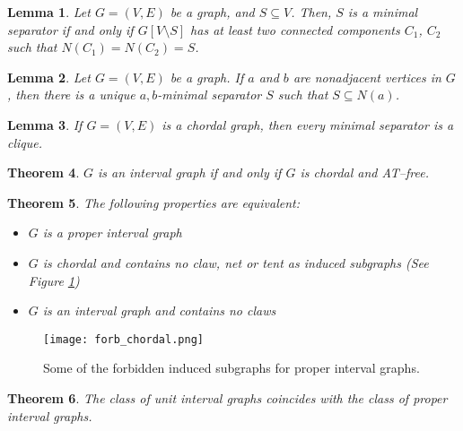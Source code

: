 \documentclass[12pt]{book}
\theoremstyle{plain}
\newtheorem{teo}{Theorem}[chapter]
\newtheorem{lema}[teo]{Lemma}
\theoremstyle{remark}
\begin{document}
\begin{lema} \label{lema_separadores_2comp} \cite{KK98}
	Let $G=(V,E)$ be a graph, and $S \subseteq V$. Then, $S$ is a minimal separator if and only if $G \left[ V \setminus S \right]$ has at least two connected components $C_1$, $C_2$ such that $N(C_1)=N(C_2)=S$.
\end{lema}

\begin{lema} \label{lema_separadores_KK} \cite{KK98}
	Let $G=(V,E)$ be a graph. If $a$ and $b$ are nonadjacent vertices in $G$, then there is a unique $a,b$-minimal separator $S$ such that $S \subseteq N(a)$.
\end{lema}

\begin{lema} \label{lema_separador_clique} \cite{D61}
	If $G = (V,E)$ is a chordal graph, then every minimal separator is a clique.
\end{lema}

\begin{teo} \label{teo_caract_intAT} \cite{LB62}
	$G$ is an interval graph if and only if $G$ is chordal and AT--free.
\end{teo}

\begin{teo} \label{teo_caract_int_prop} \cite{J92}
The following properties are equivalent:
	\begin{itemize}
		\item $G$ is a proper interval graph
		\item $G$ is chordal and contains no claw, net or tent as induced subgraphs (See Figure \ref{fig:forb_chordal})
		\item $G$ is an interval graph and contains no claws
	\end{itemize}
\end{teo}

\begin{figure}[h]
\centering
\texttt{[image: forb\_chordal.png]}
\caption{Some of the forbidden induced subgraphs for proper interval graphs.} \label{fig:forb_chordal}
\end{figure}

\begin{teo} \label{teo_coinciden} \cite{R69}
	The class of unit interval graphs coincides with the class of proper interval graphs.
\end{teo}





\end{document}
